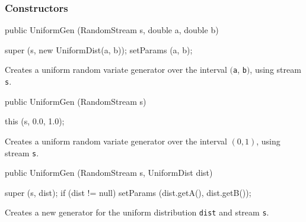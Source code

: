 \subsubsection* {Constructors}
\begin{code}

   public UniformGen (RandomStream s, double a, double b) \begin{hide} {
      super (s, new UniformDist(a, b));
      setParams (a, b);
   }\end{hide}
\end{code} 
\begin{tabb}  Creates a uniform random variate generator over the interval
  $($\texttt{a}, \texttt{b}$)$, using stream \texttt{s}. 
\end{tabb}
\begin{code}

   public UniformGen (RandomStream s) \begin{hide} {
      this (s, 0.0, 1.0);
   }\end{hide}
\end{code} 
\begin{tabb}  Creates a uniform random variate generator over the interval
  $(0, 1)$, using stream \texttt{s}.
\end{tabb}
\begin{code}
 
   public UniformGen (RandomStream s, UniformDist dist) \begin{hide} {
      super (s, dist);
      if (dist != null)
         setParams (dist.getA(), dist.getB());
   }\end{hide}
\end{code}
\begin{tabb}  Creates a new generator for the uniform distribution \texttt{dist}
   and stream \texttt{s}.
\end{tabb}

